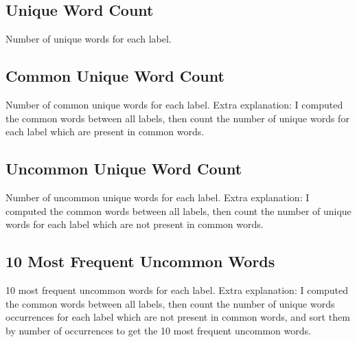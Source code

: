 \subsection{Unique Word Count}
Number of unique words for each label.
\begin{adjustbox}{max width=\textwidth}
\end{adjustbox}

\subsection{Common Unique Word Count}
Number of common unique words for each label.  
Extra explanation: I computed the common words between all labels, then count the number of unique words for each label which are present in common words.
\begin{adjustbox}{max width=\textwidth}
\end{adjustbox}

\subsection{Uncommon Unique Word Count}
Number of uncommon unique words for each label.  
Extra explanation: I computed the common words between all labels, then count the number of unique words for each label which are not present in common words.
\begin{adjustbox}{max width=\textwidth}
\end{adjustbox}

\subsection{10 Most Frequent Uncommon Words}
10 most frequent uncommon words for each label.  
Extra explanation: I computed the common words between all labels, then count the number of unique words occurrences for each label which are not present in common words, and sort them by number of occurrences to get the 10 most frequent uncommon words.
\begin{adjustbox}{max width=\textwidth}
\end{adjustbox}

